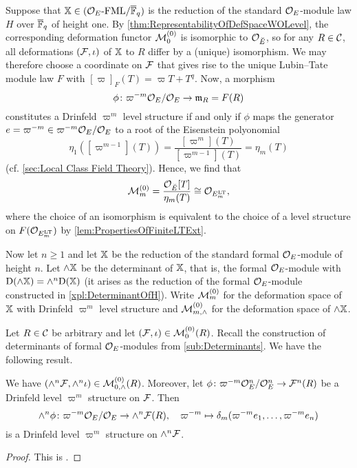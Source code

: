 \documentclass[../main.tex]{subfiles}
\begin{document}
Suppose that $\mathbb{X} \in {({\mathcal{O}_E}\textnormal-\allowbreak\mathrm{FML}/{{\overline{\mathbb{F}}_q}})}$ is the reduction of the standard
$\mathcal{O}_E$-module law $H$ over ${\overline {\mathbb{F}}_q}$ of height one. 
By \cref{thm:RepresentabilityOfDefSpaceWOLevel}, the corresponding deformation functor
$\mathcal{M}_0^{(0)}$ is isomorphic to $\mathcal{O}_{\breve {E}}$, so for any $R \in \mathcal{C}$, all deformations
$(\mathcal{F}, \iota)$ of $\mathbb{X}$ to $R$ differ by a (unique) isomorphism. We may therefore
choose a coordinate on
$\mathcal{F}$ that gives rise to the unique Lubin--Tate module law $F$ with
$[\varpi]_F(T) = \varpi T + T^q$. Now, a morphism 
\begin{equation*}
  \phi \colon \varpi^{-m}\mathcal{O}_E / \mathcal{O}_E \to \mathfrak{m}_R = F(R)
\end{equation*}
constitutes a Drinfeld $\varpi^m$ level structure if and only if 
$\phi$ maps the generator $e = \varpi^{-m} \in \varpi^{-m} \mathcal{O}_E/\mathcal{O}_E$ 
to a root of the Eisenstein polyonomial 
\begin{equation*}
  \eta_1([\varpi^{m-1}](T)) = \frac{[\varpi^m](T)}{[\varpi^{m-1}](T)} = \eta_m(T)
\end{equation*}
(cf. \cref{sec:Local Class Field Theory}). 
Hence, we find that 
\begin{equation}\label{eq:HeightOneDefSpaceIsOEm}
  \mathcal{M}_{m}^{(0)} = \frac{\mathcal{O}_{\breve {E}}[T]}{\eta_m(T)} \cong \mathcal{O}_{E_m^{\mathrm{LT}}},
\end{equation}
where the choice of an isomorphism is equivalent to the choice of a level structure 
on $F(\mathcal{O}_{E_m^{\mathrm{LT}}})$ by \cref{lem:PropertiesOfFiniteLTExt}. 

Now let $n \geq 1$ and let $\mathbb{X}$ be the reduction of the standard formal 
$\mathcal{O}_E$-module of height $n$. Let $\wedge \mathbb{X}$ be the determinant of $\mathbb{X}$,
that is, the formal $\mathcal{O}_E$-module with $\mathrm{D}(\wedge \mathbb{X}) = \wedge^n \mathrm{D}(\mathbb{X})$
(it arises as the reduction of the formal $\mathcal{O}_E$-module constructed in
\cref{xpl:DeterminantOfH}).
Write $\mathcal{M}_m^{(0)}$ for the deformation space of $\mathbb{X}$ with Drinfeld $\varpi^m$
level structure and $\mathcal{M}_{m, \wedge}^{(0)}$ for the deformation space of $\wedge \mathbb{X}$. 

Let $R \in \mathcal{C}$ be arbitrary and let $(\mathcal{F}, \iota) \in \mathcal{M}_0^{(0)}(R)$. 
Recall the construction of determinants of formal $\mathcal{O}_E$-modules
from \cref{sub:Determinants}. We have the following result.

\begin{lem}\label{lem:DeterminantOfDrinfeldStructure}
  We have $(\wedge^n \mathcal{F}, \wedge^n \iota) \in \mathcal{M}_{0, \wedge}^{(0)}(R)$.
  Moreover,
  let $\phi\colon \varpi^{-m} \mathcal{O}_E^n/\mathcal{O}_E^n \to  \mathcal{F}^n(R)$ be a Drinfeld level
  $\varpi^m$ structure on $\mathcal{F}$. Then 
  \begin{equation*}
    \wedge^n \phi \colon \varpi^{-m} \mathcal{O}_E/\mathcal{O}_E \to \wedge^n\mathcal{F}(R), \quad 
  \varpi^{-m} \mapsto \delta_m(\varpi^{-m} e_1, \dots, \varpi^{-m} e_n)
  \end{equation*}
  is a Drinfeld level $\varpi^m$ structure on $\wedge^n \mathcal{F}$.
\begin{proof}
  This is \cite[Proposition 2.11]{weinstein2016semistable}.
\end{proof}
\end{lem}
\end{document}
